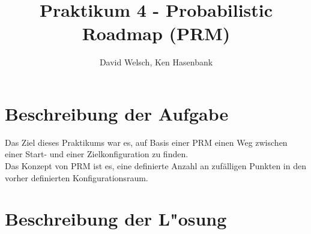 \documentclass[a4paper]{scrartcl}
\begin{document}
\titlehead{Wintersemester 2017/2018\\Motion Planning\\Prof. Horsch, Rudi Scheitler}
\author{David Welsch, Ken Hasenbank}
\title{Praktikum 4 - Probabilistic Roadmap (PRM)}
\maketitle

\section*{Beschreibung der Aufgabe}

Das Ziel dieses Praktikums war es, auf Basis einer PRM einen Weg zwischen einer Start- und einer Zielkonfiguration zu finden. \\

Das Konzept von PRM ist es, eine definierte Anzahl an zufälligen Punkten in den vorher definierten Konfigurationsraum. 

\section*{Beschreibung der L"osung}
\end{document}
